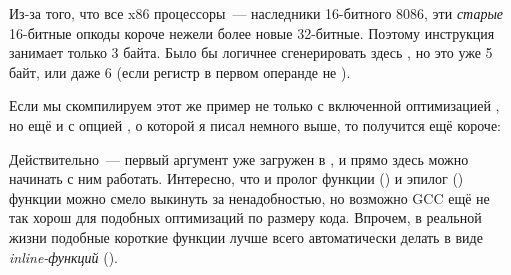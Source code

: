 Из-за того, что все x86 процессоры~--- наследники 16-битного 8086, эти \emph{старые} 16-битные опкоды короче 
нежели более новые 32-битные. 
Поэтому инструкция  занимает только 3 байта. 
Было бы логичнее сгенерировать здесь , но это уже 5 байт, или даже 6 
(если регистр в первом операнде не \EAX).


Если мы скомпилируем этот же пример не только с включенной оптимизацией \Othree, 
но ещё и с опцией , о которой я писал немного выше, то получится ещё короче:



Действительно~--- первый аргумент уже загружен в \EAX, и прямо здесь можно начинать с ним работать. 
Интересно, что и пролог функции () и эпилог () 
функции можно смело выкинуть за ненадобностью, 
но возможно GCC ещё не так хорош для подобных оптимизаций по размеру кода. 
Впрочем, в реальной жизни подобные короткие функции лучше всего автоматически делать в виде 
\emph{inline-функций} ().

